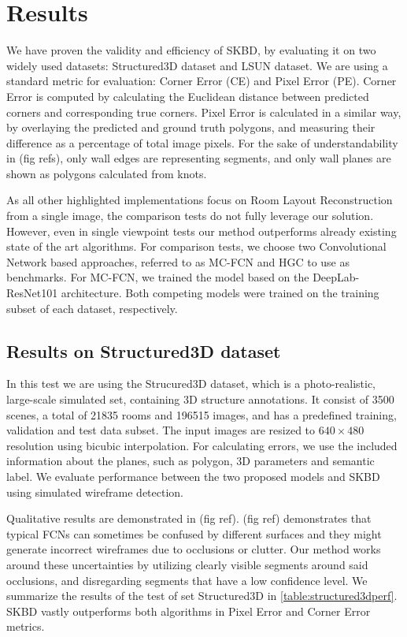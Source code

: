 \section{Results}
\label{sec:results}
We have proven the validity and efficiency of SKBD, by evaluating it on two widely used datasets: Structured3D dataset\cite{zheng2020structured3d} and LSUN dataset\cite{zhang2015large}. We are using a standard metric for evaluation: Corner Error (CE) and Pixel Error (PE). Corner Error is computed by calculating the Euclidean distance between predicted corners and corresponding true corners. Pixel Error is calculated in a similar way, by overlaying the predicted and ground truth polygons, and measuring their difference as a percentage of total image pixels. For the sake of understandability in (fig refs), only wall edges are representing segments, and only wall planes are shown as polygons calculated from knots.

As all other highlighted implementations\cite{8451365}\cite{10350607} focus on Room Layout Reconstruction from a single image, the comparison tests do not fully leverage our solution. However, even in single viewpoint tests our method outperforms already existing state of the art algorithms. For comparison tests, we choose two Convolutional Network based approaches, referred to as MC-FCN\cite{8451365} and HGC\cite{10350607} to use as benchmarks. For MC-FCN, we trained the model based on the DeepLab-ResNet101\cite{chen2017deeplab} architecture. Both competing models were trained on the training subset of each dataset, respectively.


\subsection{Results on Structured3D dataset}
In this test we are using the Strucured3D dataset\cite{zheng2020structured3d}, which is a photo-realistic, large-scale simulated set, containing 3D structure annotations. It consist of 3500 scenes, a total of 21835 rooms and 196515 images, and has a predefined training, validation and test data subset. The input images are resized to \(640 \times 480 \) resolution using bicubic interpolation. For calculating errors, we use the included information about the planes, such as polygon, 3D parameters and semantic label. We evaluate performance between the two proposed models and SKBD using simulated wireframe detection. 

Qualitative results are demonstrated in (fig ref). (fig ref) demonstrates that typical FCNs can sometimes be confused by different surfaces and they might generate incorrect wireframes due to occlusions or clutter. Our method works around these uncertainties by utilizing clearly visible segments around said occlusions, and disregarding segments that have a low confidence level. We summarize the results of the test of set Structured3D in \autoref{table:structured3dperf}. SKBD vastly outperforms both algorithms in Pixel Error and Corner Error metrics.

